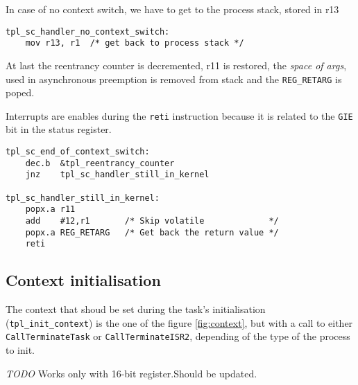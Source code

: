 \documentclass[11pt, oneside]{article}   	%
\begin{document}
In case of no context switch, we have to get to the process stack, stored in r13

\begin{lstlisting}[backgroundcolor=\color{red!15}]
tpl_sc_handler_no_context_switch:
	mov r13, r1	 /* get back to process stack */
\end{lstlisting}
At last the reentrancy counter is decremented, r11 is restored, the \emph{space of args}, used in asynchronous preemption is removed from stack and the \lstinline{REG_RETARG} is poped.

Interrupts are enables during the \texttt{reti} instruction because it is related to the \texttt{GIE} bit in the status register.
\begin{lstlisting}[backgroundcolor=\color{yellow!15}]
tpl_sc_end_of_context_switch:
    dec.b  &tpl_reentrancy_counter
    jnz    tpl_sc_handler_still_in_kernel    

tpl_sc_handler_still_in_kernel:
    popx.a r11
    add    #12,r1       /* Skip volatile             */
    popx.a REG_RETARG   /* Get back the return value */
    reti
\end{lstlisting}

\subsection{Context initialisation}
The context that shoud be set during the task's initialisation (\texttt{tpl\_init\_context}) is the one of the figure \ref{fig:context}, but with a call to either \texttt{CallTerminateTask} or \texttt{CallTerminateISR2}, depending of the type of the process to init.

\emph{TODO} Works only with 16-bit register.Should be updated.
\end{document}
